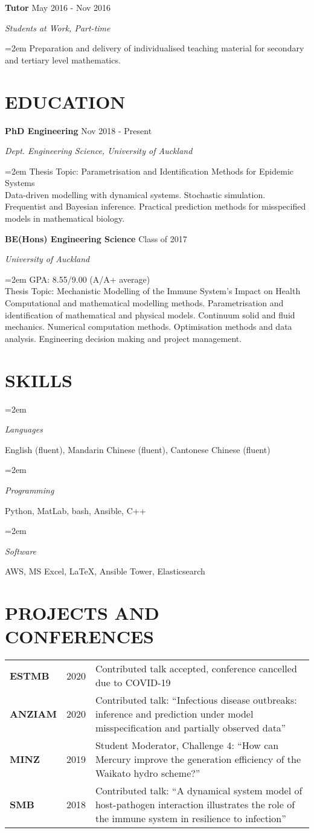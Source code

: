 \documentclass[paper=a4paper,fontsize=11pt]{scrartcl} %
\newlength{\spacebox}
\newcommand{\NewPart}[1]{\section*{\uppercase{#1}}}
\newcommand{\PersonalEntry}[2]{
		\noindent\hangindent=2em\hangafter=0 %
		\parbox{\spacebox}{        %
		\textit{#1}}		       %
		\hspace{1.5em} #2 \par}    %
\newcommand{\SkillsEntry}[2]{      %
		\noindent\hangindent=2em\hangafter=0 %
		\parbox{\spacebox}{        %
		\textit{#1}}			   %
		\hspace{1.5em} #2 \par}    %
\newcommand{\EducationEntry}[4]{
		\noindent \textbf{#1} \hfill      %
		{#2} \par  %
		\noindent \textit{#3} \par        %
		\noindent\hangindent=2em\hangafter=0 \small #4 %
		\normalsize \par\par}
\newcommand{\WorkEntry}[4]{				  %
		\noindent \textbf{#1} \hfill      %
		{#2} \par  %
		\noindent \textit{#3} \par              %
		\noindent\hangindent=2em\hangafter=0 \small #4 %
		\normalsize \par\par}
\begin{document}
\WorkEntry{Tutor}{May 2016 - Nov 2016}{Students at Work, Part-time}{Preparation and delivery of individualised teaching material for secondary and tertiary level mathematics.}

\NewPart{Education}

\EducationEntry{PhD Engineering}{Nov 2018 - Present}{Dept. Engineering Science, University of Auckland}{Thesis Topic: Parametrisation and Identification Methods for Epidemic Systems\\ Data-driven modelling with dynamical systems. Stochastic simulation. Frequentist and Bayesian inference. Practical prediction methods for misspecified models in mathematical biology.}

\EducationEntry{BE(Hons) Engineering Science}{Class of 2017}{University of Auckland}{GPA: 8.55/9.00 (A/A+ average)\\ Thesis Topic: Mechanistic Modelling of the Immune System's Impact on Health \\ Computational and mathematical modelling methods. Parametrisation and identification of mathematical and physical models. Continuum solid and fluid mechanics. Numerical computation methods. Optimisation methods and data analysis. Engineering decision making and project management.}


\NewPart{Skills}


\SkillsEntry{Languages}{English (fluent), Mandarin Chinese (fluent), Cantonese Chinese (fluent)}

\SkillsEntry{Programming}{Python, MatLab, bash, Ansible, C++}

\SkillsEntry{Software}{AWS, MS Excel, \LaTeX, Ansible Tower, Elasticsearch}%

\NewPart{Projects and Conferences}
\begin{tabular}{p{\spacebox} p{0.5\spacebox} p{6.7\spacebox}}
\textbf{ESTMB} & {2020} & {Contributed talk accepted, conference cancelled due to COVID-19}\\
\textbf{ANZIAM} & {2020} & {Contributed talk: ``Infectious disease outbreaks: inference and prediction under model misspecification and partially observed data''}\\
\textbf{MINZ} & {2019} & {Student Moderator, Challenge 4: ``How can Mercury improve the generation efficiency of the Waikato hydro scheme?''}\\
\textbf{SMB} & {2018} & {Contributed talk: ``A dynamical system model of host-pathogen interaction illustrates the role of the immune system in resilience to infection''}\\
\end{tabular}
\end{document}
